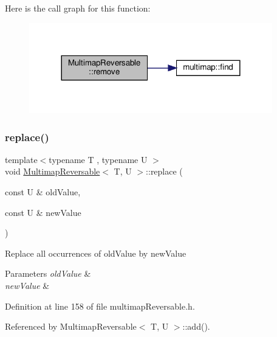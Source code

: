 Here is the call graph for this function\+:\nopagebreak
\begin{figure}[H]
\begin{center}
\leavevmode
\includegraphics[width=300pt]{classMultimapReversable_a11a0f10468c240813178e0a3f682eef5_cgraph}
\end{center}
\end{figure}
\mbox{\label{classMultimapReversable_ad3add05f4631934cacf20b258ca97efc}} 
\subsubsection{\texorpdfstring{replace()}{replace()}}
{\footnotesize\ttfamily template$<$typename T , typename U $>$ \\
void \hyperlink{classMultimapReversable}{Multimap\+Reversable}$<$ T, U $>$\+::replace (\begin{DoxyParamCaption}\item[{const U \&}]{old\+Value,  }\item[{const U \&}]{new\+Value }\end{DoxyParamCaption})\hspace{0.3cm}{\ttfamily [inline]}}

Replace all occurrences of old\+Value by new\+Value 
\begin{DoxyParams}{Parameters}
{\em old\+Value} & \\
\hline
{\em new\+Value} & \\
\hline
\end{DoxyParams}


Definition at line 158 of file multimap\+Reversable.\+h.



Referenced by Multimap\+Reversable$<$ T, U $>$\+::add().

\mbox{\label{classMultimapReversable_afaf809098df54c5619f06a71507214a4}} 
